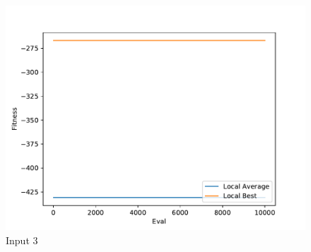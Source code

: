 \documentclass{standalone}
\begin{document}
\begin{figure}[!htb]
	\caption{Input 3}
	\label{fig:graph_3021}
	\includegraphics[width=\textwidth]{../graphs/graphs/3021.pdf}
\end{figure}
\end{document}
